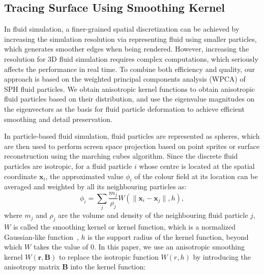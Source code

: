 \documentclass[times,twocolumn,final]{elsarticle}
\begin{document}
\subsection{Tracing Surface Using Smoothing Kernel}
In fluid simulation, a finer-grained spatial discretization can be achieved by increasing the simulation resolution via representing fluid using smaller particles, which generates smoother edges when being rendered. However, increasing the resolution for 3D fluid simulation requires complex computations, which seriously affects the performance in real time. To combine both efficiency and quality, our approach is based on the weighted principal components analysis (WPCA) of SPH fluid particles. We obtain anisotropic kernel functions to obtain anisotropic fluid particles based on their distribution, and use the eigenvalue magnitudes on the eigenvectors as the basis for fluid particle deformation to achieve efficient smoothing and detail preservation.

In particle-based fluid simulation, fluid particles are represented as spheres, which are then used to perform screen space projection based on point sprites or surface reconstruction using the marching cubes algorithm. Since the discrete fluid particles are isotropic, for a fluid particle $i$ whose centre is located at the spatial coordinate $\mathbf{x}_i$, the approximated value $\phi_i$ of the colour field at its location can be averaged and weighted by all its neighbouring particles as:
\begin{equation}
\phi_{i}=\sum_{j} \frac{m_{j}}{\rho_{j}} W\left(\|\mathbf{x}_i-\mathbf{x}_j\|, h\right),
\label{con:equa9}
\end{equation}
where $m_j$ and $\rho_j$ are the volume and density of the neighbouring fluid particle $j$, $W$ is called the smoothing kernel or kernel function, which is a normalized Gaussian-like function~\cite{Ihmsen14}, $h$ is the support radius of the kernel function, beyond which $W$ takes the value of 0. In this paper, we use an anisotropic smoothing kernel $W(\mathbf{r},\mathbf{B})$ to replace the isotropic function $W(r,h)$ by introducing the anisotropy matrix $\mathbf{B}$ into the kernel function:
\end{document}
